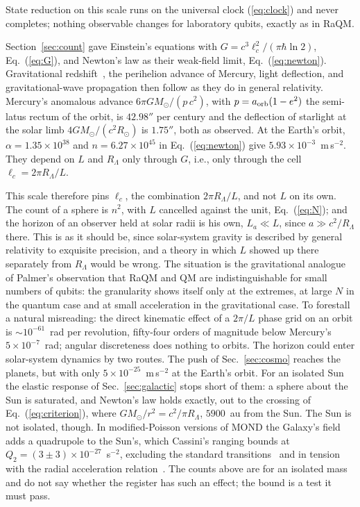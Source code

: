 \documentclass[aps,prd,twocolumn,superscriptaddress,nofootinbib,showkeys]{revtex4-2}
\makeatletter
\newcommand{\lc}{\ell_c}
\newcommand{\RL}{R_\Lambda}
\def\subsection{\@startsection{subsection}{2}{\z@}{0.6cm \@plus1ex \@minus .2ex}{0.35cm}{\normalfont\small\bfseries}}
\makeatother
\begin{document}
State reduction on this scale runs on the universal clock (\ref{eq:clock}) and never completes; nothing observable changes for laboratory qubits, exactly as in RaQM.

\subsection{Terrestrial and solar scales: the sphere}

Section~\ref{sec:count} gave Einstein's equations with $G = c^3\lc^2/(\pi\hbar\ln2)$, Eq.~(\ref{eq:G}), and Newton's law as their weak-field limit, Eq.~(\ref{eq:newton}). Gravitational redshift~\cite{pound1960}, the perihelion advance of Mercury, light deflection, and gravitational-wave propagation then follow as they do in general relativity. Mercury's anomalous advance $6\pi GM_\odot/(p\,c^2)$, with $p = a_{\rm orb}(1-e^2)$ the semi-latus rectum of the orbit, is $42.98''$ per century and the deflection of starlight at the solar limb $4GM_\odot/(c^2R_\odot)$ is $1.75''$, both as observed. At the Earth's orbit, $\alpha = 1.35\times10^{38}$ and $n = 6.27\times10^{45}$ in Eq.~(\ref{eq:newton}) give $5.93\times10^{-3}$~m\,s$^{-2}$. They depend on $L$ and $\RL$ only through $G$, i.e., only through the cell $\lc = 2\pi\RL/L$.

This scale therefore pins $\lc$, the combination $2\pi\RL/L$, and not $L$ on its own. The count of a sphere is $n^2$, with $L$ cancelled against the unit, Eq.~(\ref{eq:N}); and the horizon of an observer held at solar radii is his own, $L_a\ll L$, since $a\gg c^2/\RL$ there. This is as it should be, since solar-system gravity is described by general relativity to exquisite precision, and a theory in which $L$ showed up there separately from $\RL$ would be wrong. The situation is the gravitational analogue of Palmer's observation that RaQM and QM are indistinguishable for small numbers of qubits: the granularity shows itself only at the extremes, at large $N$ in the quantum case and at small acceleration in the gravitational case. To forestall a natural misreading: the direct kinematic effect of a $2\pi/L$ phase grid on an orbit is $\sim10^{-61}$~rad per revolution, fifty-four orders of magnitude below Mercury's $5\times10^{-7}$~rad; angular discreteness does nothing to orbits. The horizon could enter solar-system dynamics by two routes. The push of Sec.~\ref{sec:cosmo} reaches the planets, but with only $5\times10^{-25}$~m\,s$^{-2}$ at the Earth's orbit. For an isolated Sun the elastic response of Sec.~\ref{sec:galactic} stops short of them: a sphere about the Sun is saturated, and Newton's law holds exactly, out to the crossing of Eq.~(\ref{eq:criterion}), where $GM_\odot/r^2 = c^2/\pi\RL$, $5900$~au from the Sun. The Sun is not isolated, though. In modified-Poisson versions of MOND the Galaxy's field adds a quadrupole to the Sun's, which Cassini's ranging bounds at $Q_2 = (3\pm3)\times10^{-27}$~s$^{-2}$, excluding the standard transitions~\cite{hees2014} and in tension with the radial acceleration relation~\cite{desmond2024}. The counts above are for an isolated mass and do not say whether the register has such an effect; the bound is a test it must pass.
\end{document}
